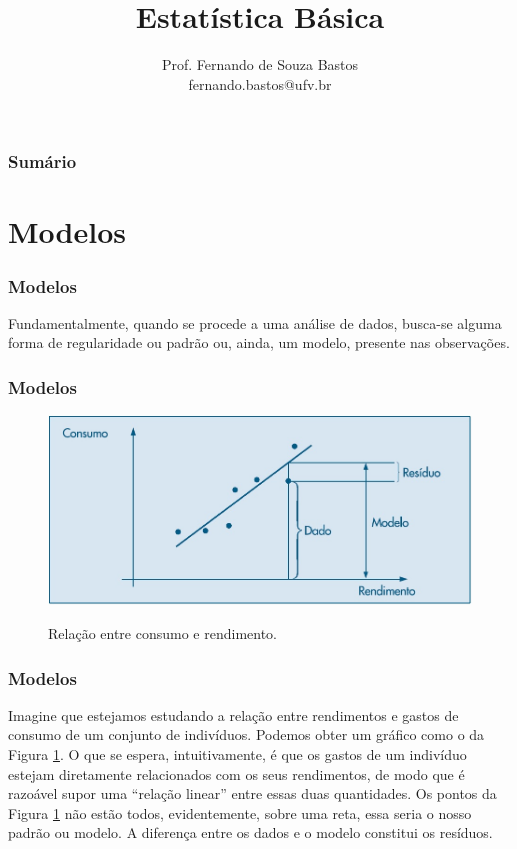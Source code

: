 \documentclass[12pt]{beamer}
\title{Estatística Básica}
\author{Prof. Fernando de Souza Bastos\texorpdfstring{\\ fernando.bastos@ufv.br}{}}
\institute{Instituto de Ciências Exatas e Tecnológicas\texorpdfstring{\\ Universidade Federal de Viçosa}{}\texorpdfstring{\\ Campus UFV - Florestal}{}}
\date{}
\begin{document}

\frame{\titlepage}

\begin{frame}{}
\frametitle{\bf Sumário}
\tableofcontents
\end{frame}

\section{Modelos}
\begin{frame}{}
\frametitle{Modelos}
\begin{block}{}
\justifying
Fundamentalmente, quando se procede a uma análise de dados, busca-se alguma forma de regularidade ou padrão ou, ainda, um modelo, presente nas observações.
\end{block}
\end{frame}

\begin{frame}{}
\frametitle{Modelos}
\begin{figure}[H]
    \centering
    \caption{Relação entre consumo e rendimento.}
    \vspace{-0.5cm}
    \includegraphics[scale=0.5]{figs/Fig1.jpg}
    \label{fig_ex1}
  \end{figure}
\end{frame}

\begin{frame}{}
\frametitle{Modelos}
\begin{block}{}
\justifying
Imagine que estejamos estudando a relação entre rendimentos e gastos de consumo de um conjunto de indivíduos. Podemos obter um gráfico como o da Figura 
\ref{fig_ex1}. O que se espera, intuitivamente, é que os gastos de um indivíduo estejam diretamente relacionados com os seus rendimentos, de modo que é razoável 
supor uma “relação linear” entre essas duas quantidades. Os pontos da Figura \ref{fig_ex1} não estão todos, evidentemente, sobre uma reta, essa seria o nosso padrão 
ou modelo. A diferença entre os dados e o modelo constitui os resíduos.
\end{block}
\end{frame}
\end{document}
